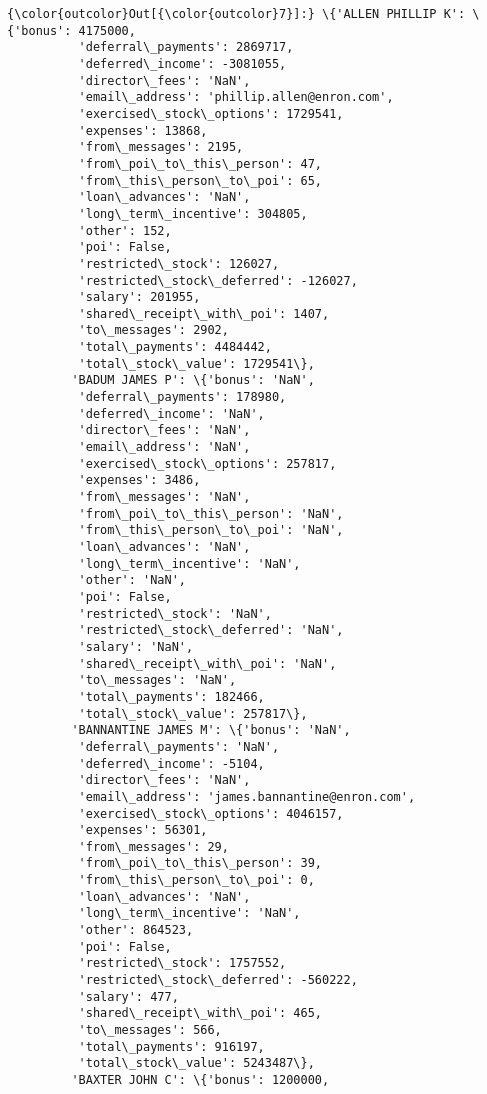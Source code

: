 \documentclass[11pt]{article}
\begin{document}
\begin{Verbatim}[commandchars=\\\{\}]
{\color{outcolor}Out[{\color{outcolor}7}]:} \{'ALLEN PHILLIP K': \{'bonus': 4175000,
          'deferral\_payments': 2869717,
          'deferred\_income': -3081055,
          'director\_fees': 'NaN',
          'email\_address': 'phillip.allen@enron.com',
          'exercised\_stock\_options': 1729541,
          'expenses': 13868,
          'from\_messages': 2195,
          'from\_poi\_to\_this\_person': 47,
          'from\_this\_person\_to\_poi': 65,
          'loan\_advances': 'NaN',
          'long\_term\_incentive': 304805,
          'other': 152,
          'poi': False,
          'restricted\_stock': 126027,
          'restricted\_stock\_deferred': -126027,
          'salary': 201955,
          'shared\_receipt\_with\_poi': 1407,
          'to\_messages': 2902,
          'total\_payments': 4484442,
          'total\_stock\_value': 1729541\},
         'BADUM JAMES P': \{'bonus': 'NaN',
          'deferral\_payments': 178980,
          'deferred\_income': 'NaN',
          'director\_fees': 'NaN',
          'email\_address': 'NaN',
          'exercised\_stock\_options': 257817,
          'expenses': 3486,
          'from\_messages': 'NaN',
          'from\_poi\_to\_this\_person': 'NaN',
          'from\_this\_person\_to\_poi': 'NaN',
          'loan\_advances': 'NaN',
          'long\_term\_incentive': 'NaN',
          'other': 'NaN',
          'poi': False,
          'restricted\_stock': 'NaN',
          'restricted\_stock\_deferred': 'NaN',
          'salary': 'NaN',
          'shared\_receipt\_with\_poi': 'NaN',
          'to\_messages': 'NaN',
          'total\_payments': 182466,
          'total\_stock\_value': 257817\},
         'BANNANTINE JAMES M': \{'bonus': 'NaN',
          'deferral\_payments': 'NaN',
          'deferred\_income': -5104,
          'director\_fees': 'NaN',
          'email\_address': 'james.bannantine@enron.com',
          'exercised\_stock\_options': 4046157,
          'expenses': 56301,
          'from\_messages': 29,
          'from\_poi\_to\_this\_person': 39,
          'from\_this\_person\_to\_poi': 0,
          'loan\_advances': 'NaN',
          'long\_term\_incentive': 'NaN',
          'other': 864523,
          'poi': False,
          'restricted\_stock': 1757552,
          'restricted\_stock\_deferred': -560222,
          'salary': 477,
          'shared\_receipt\_with\_poi': 465,
          'to\_messages': 566,
          'total\_payments': 916197,
          'total\_stock\_value': 5243487\},
         'BAXTER JOHN C': \{'bonus': 1200000,

\end{Verbatim}
\end{document}

